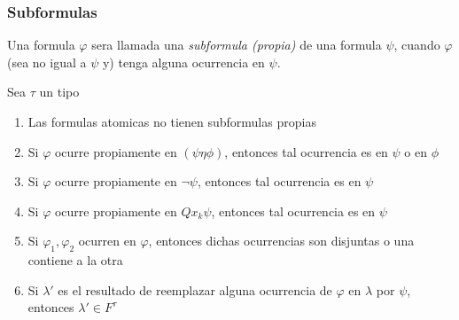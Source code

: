 \subsubsection{Subformulas}
\begin{definition}
  Una formula $\varphi$ sera llamada una \emph{subformula (propia)} de una formula $\psi$, cuando $\varphi$ (sea no igual a $\psi$ y)
  tenga alguna ocurrencia en $\psi$.
\end{definition}
\begin{lemma}
  Sea $\tau$ un tipo
  \begin{enumerate}
    \item Las formulas atomicas no tienen subformulas propias
    \item Si $\varphi$ ocurre propiamente en $(\psi\eta\phi)$, entonces tal ocurrencia es en $\psi$ o en $\phi$
    \item Si $\varphi$ ocurre propiamente en $\neg\psi$, entonces tal ocurrencia es en $\psi$
    \item Si $\varphi$ ocurre propiamente en $Qx_k\psi$, entonces tal ocurrencia es en $\psi$
    \item Si $\varphi_1, \varphi_2$ ocurren en $\varphi$, entonces dichas ocurrencias son disjuntas o una contiene a la otra
    \item Si $\lambda'$ es el resultado de reemplazar alguna ocurrencia de $\varphi$ en $\lambda$ por $\psi$, entonces $\lambda' \in F^\tau$
  \end{enumerate}
\end{lemma}
\noproof
